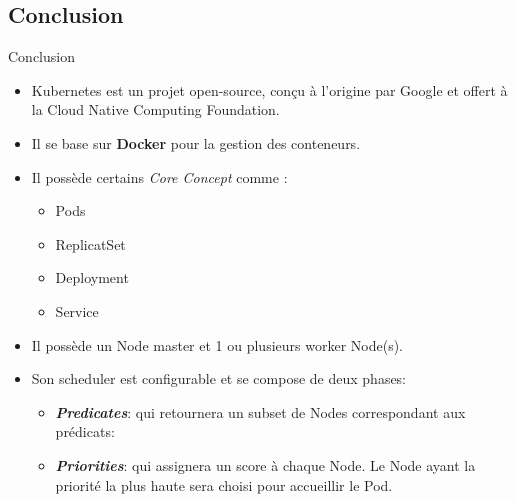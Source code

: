 \documentclass{bredelebeamer}
\begin{document}
\subsection{Conclusion}
\begin{frame}{Conclusion}
\begin{itemize}
\item Kubernetes est un projet open-source, conçu à l'origine par Google et offert à la Cloud Native Computing Foundation.
\item Il se base sur \textbf{Docker} pour la gestion des conteneurs.
\item Il possède certains \textit{Core Concept} comme : 
\begin{itemize}
\item Pods
\item ReplicatSet
\item Deployment
\item Service
\end{itemize}
\item Il possède un Node master et 1 ou plusieurs worker Node(s).
\item Son scheduler est configurable et se compose de deux phases:  
\begin{itemize}
\item \textbf{\textit{Predicates}}: qui retournera un subset de Nodes correspondant aux prédicats:
\item \textbf{\textit{Priorities}}: qui assignera un score à chaque Node. Le Node ayant la priorité la plus haute sera choisi pour accueillir le Pod.
\end{itemize}
\end{itemize}
\end{frame}
\end{document}
